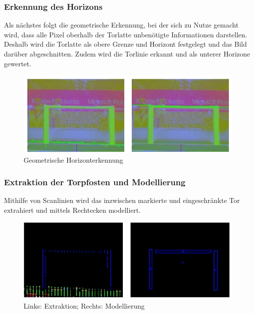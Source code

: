 \documentclass[a4paper,12pt]{article}
\begin{document}
\subsubsection{Erkennung des Horizons}
Als nächstes folgt die geometrische Erkennung, bei der sich zu Nutze gemacht
wird, dass alle Pixel oberhalb der Torlatte unbenötigte Informationen
darstellen. Deshalb wird die Torlatte als obere Grenze und Horizont 
festgelegt und das Bild darüber abgeschnitten. Zudem wird die Torlinie
erkannt und als unterer Horizone gewertet.
\begin{figure}[H]
\includegraphics[scale=0.8]{geometric-plane.png}
\caption{Geometrische Horizonterkennung}
\label{fig:geom-horiz}
\end{figure}

\subsubsection{Extraktion der Torpfosten und Modellierung}
Mithilfe von Scanlinien wird das inzwischen markierte und eingeschränkte Tor
extrahiert und mittels Rechtecken modelliert.
\begin{figure}[H]
\includegraphics[scale=0.8]{goal-blobs.png}
\caption{Links: Extraktion; Rechts: Modellierung}
\label{fig:model}
\end{figure}
\end{document}
